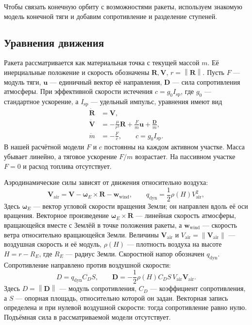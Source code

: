 \documentclass[a4paper,11pt]{article}
\newcommand{\vect}[1]{\boldsymbol{#1}}
\newcommand{\norm}[1]{\left\lVert#1\right\rVert}
\numberwithin{equation}{section}
\begin{document}
Чтобы связать конечную орбиту с возможностями ракеты,
используем знакомую модель конечной тяги и добавим
сопротивление и разделение ступеней.

\subsection{Уравнения движения}

Ракета рассматривается как материальная точка с текущей массой $m$.
Её инерциальные положение и скорость обозначены $\vect R,\vect V$,
$r=\norm{\vect R}$. Пусть $F$ --- модуль тяги,
$\vect u$ --- единичный вектор её направления, $\vect D$ ---
сила сопротивления атмосферы. При эффективной скорости истечения
$c=g_0I_{\mathrm{sp}}$, где $g_0$ --- стандартное ускорение,
а $I_{\mathrm{sp}}$ --- удельный импульс, уравнения имеют вид
\begin{equation}
\begin{aligned}
\dot{\vect R}&=\vect V,\\
\dot{\vect V}&=-\frac{\mu}{r^3}\vect R
+\frac{F}{m}\vect u+\frac{\vect D}{m},\\
\dot m&=-\frac{F}{c},\qquad c=g_0I_{\mathrm{sp}}.
\end{aligned}
\label{eq:motion}
\end{equation}
В нашей расчётной модели $F$ и $c$ постоянны
на каждом активном участке. Масса убывает линейно,
а тяговое ускорение $F/m$ возрастает.
На пассивном участке $F=0$ и расход топлива отсутствует.

Аэродинамические силы зависят от движения относительно воздуха:
\begin{equation}
\vect V_{\mathrm{air}}
=\vect V-\vect\omega_E\times\vect R-\vect w_{\mathrm{wind}},
\qquad
q_{\mathrm{dyn}}=\frac12\rho(H)V_{\mathrm{air}}^2,
\label{eq:airspeed}
\end{equation}
Здесь $\vect\omega_E$ --- вектор угловой скорости вращения Земли;
он направлен вдоль её оси вращения. Векторное произведение
$\vect\omega_E\times\vect R$ --- линейная скорость атмосферы,
вращающейся вместе с Землёй в точке положения ракеты,
а $\vect w_{\mathrm{wind}}$ --- скорость ветра относительно
вращающейся Земли. Величины $\vect V_{\mathrm{air}}$ и
$V_{\mathrm{air}}=\norm{\vect V_{\mathrm{air}}}$ --- воздушная
скорость и её модуль, $\rho(H)$ --- плотность воздуха
на высоте $H=r-R_E$, где $R_E$ --- радиус Земли.
Скоростной напор обозначен $q_{\mathrm{dyn}}$.
Сопротивление направлено против воздушной скорости:
\begin{equation}
D=q_{\mathrm{dyn}}C_DS,\qquad
\vect D=-\frac12\rho(H)C_DS\,V_{\mathrm{air}}\vect V_{\mathrm{air}}.
\label{eq:drag}
\end{equation}
Здесь $D=\norm{\vect D}$ --- модуль сопротивления,
$C_D$ --- коэффициент сопротивления, а $S$ --- опорная площадь,
относительно которой он задан.
Векторная запись определена и при нулевой воздушной скорости:
тогда сопротивление равно нулю.
Подъёмная сила в рассматриваемой модели отсутствует.
\end{document}
